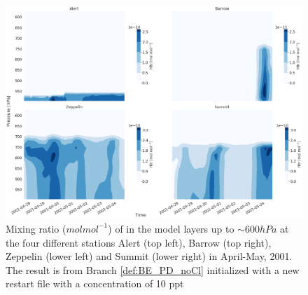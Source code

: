 \begin{figure}[h]
    \centering
    \includegraphics[width=\linewidth]{Chapter6_Results/images/Vert_StationComp_2001/vertHBr_newRestart.png}
    \caption{Mixing ratio ($mol mol^{-1}$) of  in the model layers up to $\sim 600 hPa$ at the four different stations Alert (top left), Barrow (top right), Zeppelin (lower left) and Summit (lower right) in April-May, 2001. The result is from Branch \ref{def:BE_PD_noCl} initialized with a new restart file with a  concentration of 10 ppt}
    \label{fig:vertHBr_newRestart}
\end{figure}